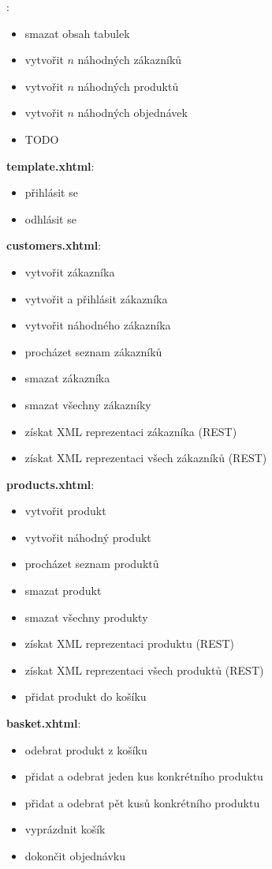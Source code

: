 \documentclass[122pt,oneside]{fithesis}
\begin{document}
:
\begin{itemize}  \itemsep0em
  \item smazat obsah tabulek
  \item vytvořit $n$ náhodných zákazníků 
  \item vytvořit $n$ náhodných produktů
  \item vytvořit $n$ náhodných objednávek
  \item TODO
\end{itemize}
{\bf template.xhtml}:
\begin{itemize}  \itemsep0em
  \item přihlásit se 
  \item odhlásit se
\end{itemize}
{\bf customers.xhtml}:
\begin{itemize}  \itemsep0em
  \item vytvořit zákazníka
  \item vytvořit a přihlásit zákazníka
  \item vytvořit náhodného zákazníka
  \item procházet seznam zákazníků
  \item smazat zákazníka
  \item smazat všechny zákazníky
  \item získat XML reprezentaci zákazníka (REST)
  \item získat XML reprezentaci všech zákazníků (REST)
\end{itemize}
{\bf products.xhtml}:
\begin{itemize}  \itemsep0em
  \item vytvořit produkt
  \item vytvořit náhodný produkt
  \item procházet seznam produktů
  \item smazat produkt
  \item smazat všechny produkty
  \item získat XML reprezentaci produktu (REST)
  \item získat XML reprezentaci všech produktů (REST)
  \item přidat produkt do košíku
\end{itemize}
{\bf basket.xhtml}:
\begin{itemize}  \itemsep0em
  \item odebrat produkt z košíku
  \item přidat a odebrat jeden kus konkrétního produktu
  \item přidat a odebrat pět kusů konkrétního produktu
  \item vyprázdnit košík
  \item dokončit objednávku
\end{itemize}
\end{document}
